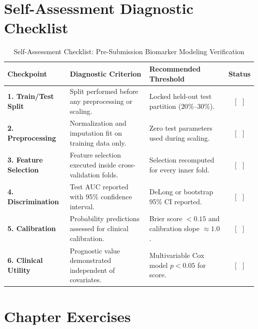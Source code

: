 \documentclass[11pt,twoside,openright]{book}
\begin{document}
\section{Self-Assessment Diagnostic Checklist}

\begin{table}[ht]
\centering
\caption{Self-Assessment Checklist: Pre-Submission Biomarker Modeling Verification}
\label{tab:checklist_biomarker}
\small
\begin{tabularx}{\textwidth}{l p{5.5cm} X c}
\toprule
\textbf{Checkpoint} & \textbf{Diagnostic Criterion} & \textbf{Recommended Threshold} & \textbf{Status} \\
\midrule
\textbf{1. Train/Test Split} & Split performed before any preprocessing or scaling. & Locked held-out test partition ($20\%$--$30\%$). & [ \ ] \\
\addlinespace
\textbf{2. Preprocessing} & Normalization and imputation fit on training data only. & Zero test parameters used during scaling. & [ \ ] \\
\addlinespace
\textbf{3. Feature Selection} & Feature selection executed inside cross-validation folds. & Selection recomputed for every inner fold. & [ \ ] \\
\addlinespace
\textbf{4. Discrimination} & Test AUC reported with 95\% confidence interval. & DeLong or bootstrap 95\% CI reported. & [ \ ] \\
\addlinespace
\textbf{5. Calibration} & Probability predictions assessed for clinical calibration. & Brier score $< 0.15$ and calibration slope $\approx 1.0$. & [ \ ] \\
\addlinespace
\textbf{6. Clinical Utility} & Prognostic value demonstrated independent of covariates. & Multivariable Cox model $p < 0.05$ for score. & [ \ ] \\
\bottomrule
\end{tabularx}
\end{table}

\FloatBarrier

\section{Chapter Exercises}
\end{document}

